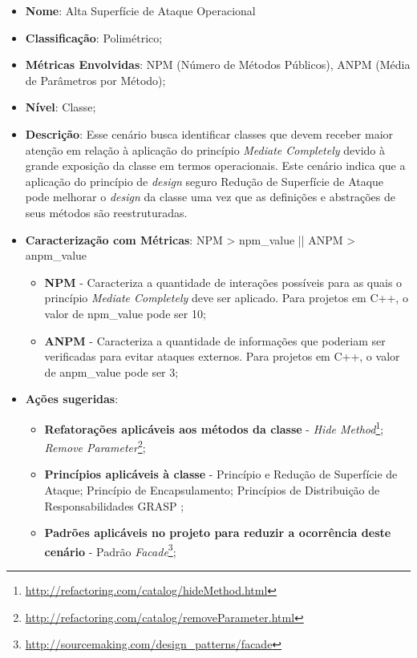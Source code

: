 \begin{itemize}
\item \textbf{Nome}: Alta Superfície de Ataque Operacional
\item \textbf{Classificação}: Polimétrico;
\item \textbf{Métricas Envolvidas}: NPM (Número de Métodos Públicos), ANPM (Média de Parâmetros por Método); 
\item \textbf{Nível}: Classe;
\item \textbf{Descrição}: Esse cenário busca identificar classes que devem receber maior atenção em relação à aplicação do princípio \emph{Mediate Completely} devido à grande exposição da classe em termos operacionais. Este cenário indica que a aplicação do princípio de \emph{design} seguro Redução de Superfície de Ataque pode melhorar o \emph{design} da classe uma vez que as definições e abstrações de seus métodos são reestruturadas.
\item \textbf{Caracterização com Métricas}: NPM > npm\_value || ANPM > anpm\_value
	\begin{itemize}
	\item \textbf{NPM} - Caracteriza a quantidade de interações possíveis para as quais o princípio \emph{Mediate Completely} deve ser aplicado. Para projetos em C++, o valor de npm\_value pode ser 10;
	\item \textbf{ANPM} - Caracteriza a quantidade de informações que poderiam ser verificadas para evitar ataques externos. Para projetos em C++, o valor de anpm\_value pode ser 3; 
	\end{itemize}
\item \textbf{Ações sugeridas}: 
	\begin{itemize}
	\item \textbf{Refatorações aplicáveis aos métodos da classe} - \emph{Hide Method}\footnote{\url{http://refactoring.com/catalog/hideMethod.html}}; \emph{Remove Parameter}\footnote{\url{http://refactoring.com/catalog/removeParameter.html}};
	\item \textbf{Princípios aplicáveis à classe} - Princípio e Redução de Superfície de Ataque; Princípio de Encapsulamento; Princípios de Distribuição de Responsabilidades GRASP \cite{larman2007};
	\item \textbf{Padrões aplicáveis no projeto para reduzir a ocorrência deste cenário} - Padrão \emph{Facade}\footnote{\url{http://sourcemaking.com/design_patterns/facade}};
	\end{itemize}
\end{itemize}


